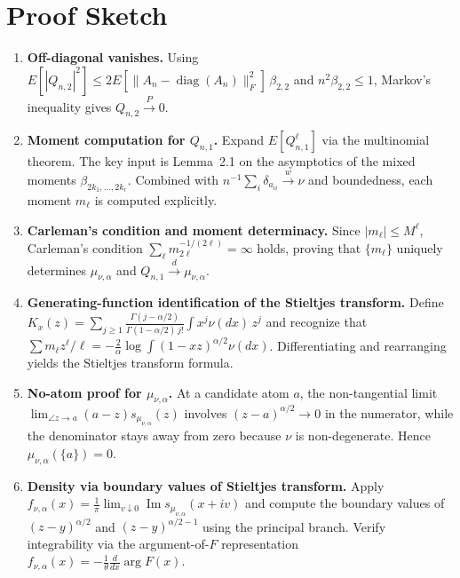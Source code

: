 \documentclass[11pt,a4paper]{article}
\theoremstyle{definition}
\begin{document}
\section{Proof Sketch}

\begin{enumerate}[leftmargin=*,label=\textbf{Step \arabic*.}]

\item \textbf{Off-diagonal vanishes.}
Using $E[|Q_{n,2}|^2]\le 2E[\|A_n-\operatorname{diag}(A_n)\|_F^2]\,\beta_{2,2}$ and $n^2\beta_{2,2}\le 1$, Markov's inequality gives $Q_{n,2}\xrightarrow{P}0$.

\item \textbf{Moment computation for $Q_{n,1}$.}
Expand $E[Q_{n,1}^\ell]$ via the multinomial theorem.  The key input is Lemma~2.1 on the asymptotics of the mixed moments $\beta_{2k_1,\dots,2k_r}$.  Combined with $n^{-1}\sum_i\delta_{a_{ii}}\xrightarrow{w}\nu$ and boundedness, each moment $m_\ell$ is computed explicitly.

\item \textbf{Carleman's condition and moment determinacy.}
Since $|m_\ell|\le M^\ell$, Carleman's condition $\sum_\ell m_{2\ell}^{-1/(2\ell)}=\infty$ holds, proving that $\{m_\ell\}$ uniquely determines $\mu_{\nu,\alpha}$ and $Q_{n,1}\xrightarrow{d}\mu_{\nu,\alpha}$.

\item \textbf{Generating-function identification of the Stieltjes transform.}
Define $K_x(z)=\sum_{j\ge 1}\frac{\Gamma(j-\alpha/2)}{\Gamma(1-\alpha/2)\,j!}\int x^j\nu(dx)\,z^j$ and recognize that $\sum m_\ell z^\ell/\ell = -\frac{2}{\alpha}\log\!\int(1-xz)^{\alpha/2}\nu(dx)$.  Differentiating and rearranging yields the Stieltjes transform formula.

\item \textbf{No-atom proof for $\mu_{\nu,\alpha}$.}
At a candidate atom $a$, the non-tangential limit $\lim_{\angle z\to a}(a-z)s_{\mu_{\nu,\alpha}}(z)$ involves $(z-a)^{\alpha/2}\to 0$ in the numerator, while the denominator stays away from zero because $\nu$ is non-degenerate.  Hence $\mu_{\nu,\alpha}(\{a\})=0$.

\item \textbf{Density via boundary values of Stieltjes transform.}
Apply $f_{\nu,\alpha}(x)=\frac{1}{\pi}\lim_{v\downarrow 0}\operatorname{Im}s_{\mu_{\nu,\alpha}}(x+iv)$ and compute the boundary values of $(z-y)^{\alpha/2}$ and $(z-y)^{\alpha/2-1}$ using the principal branch.  Verify integrability via the argument-of-$F$ representation $f_{\nu,\alpha}(x)=-\frac{1}{\theta}\frac{d}{dx}\arg F(x)$.


\end{enumerate}
\end{document}

